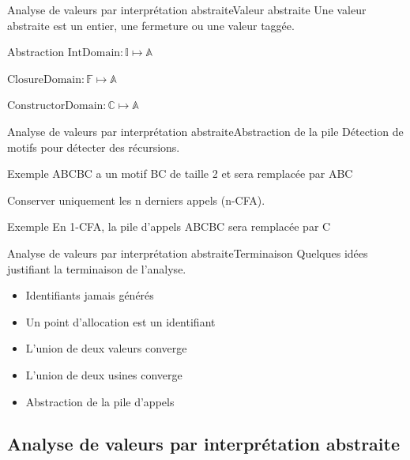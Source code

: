 \documentclass{beamer}
\begin{document}
\begin{frame}{Analyse de valeurs par interprétation abstraite}{Valeur abstraite}
    Une valeur abstraite est un entier, une fermeture ou une valeur taggée.

    \begin{block}{Abstraction}
        $\text{IntDomain} : \mathbb{I} \mapsto \mathbb{A}$

        $\text{ClosureDomain} : \mathbb{F} \mapsto \mathbb{A}$

        $\text{ConstructorDomain} : \mathbb{C} \mapsto \mathbb{A}$
    \end{block}
\end{frame}

\begin{frame}{Analyse de valeurs par interprétation abstraite}{Abstraction de la pile}
    Détection de motifs pour détecter des récursions.

    \begin{exampleblock}{Exemple}
        ABCBC a un motif BC de taille 2 et sera remplacée par ABC
    \end{exampleblock}

    Conserver uniquement les n derniers appels (n-CFA).

    \begin{exampleblock}{Exemple}
        En 1-CFA, la pile d'appels ABCBC sera remplacée par C
    \end{exampleblock}
\end{frame}

\begin{frame}{Analyse de valeurs par interprétation abstraite}{Terminaison}
    Quelques idées justifiant la terminaison de l'analyse.

    \begin{itemize}
        \item Identifiants jamais générés
        \item Un point d'allocation est un identifiant
        \item L'union de deux valeurs converge
        \item L'union de deux usines converge
        \item Abstraction de la pile d'appels
    \end{itemize}
\end{frame}






\iffalse

\subsection{Analyse de valeurs par interprétation abstraite}
\end{document}
